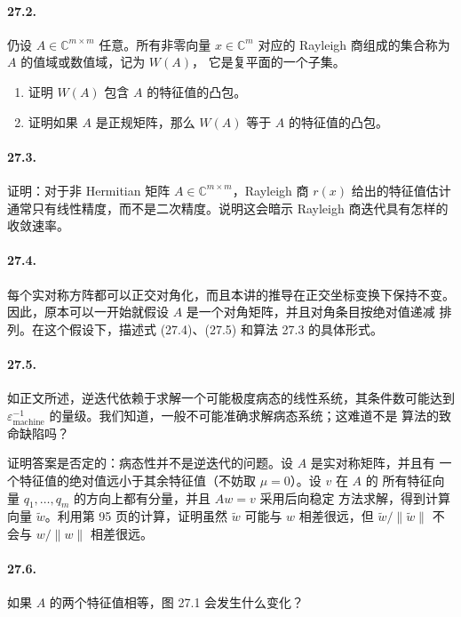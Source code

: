 \documentclass[UTF8,fontset=none,12pt]{ctexart}
\newcommand{\epsmach}{\varepsilon_{\mathrm{machine}}}
\begin{document}
\paragraph{27.2.}
仍设 $A\in\mathbb{C}^{m\times m}$ 任意。所有非零向量 $x\in\mathbb{C}^m$
对应的 Rayleigh 商组成的集合称为 $A$ 的值域或数值域，记为 $W(A)$，
它是复平面的一个子集。

\begin{enumerate}[label=(\alph*)]
  \item 证明 $W(A)$ 包含 $A$ 的特征值的凸包。
  \item 证明如果 $A$ 是正规矩阵，那么 $W(A)$ 等于 $A$ 的特征值的凸包。
\end{enumerate}

\paragraph{27.3.}
证明：对于非 Hermitian 矩阵 $A\in\mathbb{C}^{m\times m}$，Rayleigh 商
$r(x)$ 给出的特征值估计通常只有线性精度，而不是二次精度。说明这会暗示
Rayleigh 商迭代具有怎样的收敛速率。

\paragraph{27.4.}
每个实对称方阵都可以正交对角化，而且本讲的推导在正交坐标变换下保持不变。
因此，原本可以一开始就假设 $A$ 是一个对角矩阵，并且对角条目按绝对值递减
排列。在这个假设下，描述式 (27.4)、(27.5) 和算法 27.3 的具体形式。

\paragraph{27.5.}
如正文所述，逆迭代依赖于求解一个可能极度病态的线性系统，其条件数可能达到
$\epsmach^{-1}$ 的量级。我们知道，一般不可能准确求解病态系统；这难道不是
算法的致命缺陷吗？

证明答案是否定的：病态性并不是逆迭代的问题。设 $A$ 是实对称矩阵，并且有
一个特征值的绝对值远小于其余特征值（不妨取 $\mu=0$）。设 $v$ 在 $A$ 的
所有特征向量 $q_1,\ldots,q_m$ 的方向上都有分量，并且 $Aw=v$ 采用后向稳定
方法求解，得到计算向量 $\widetilde w$。利用第 95 页的计算，证明虽然
$\widetilde w$ 可能与 $w$ 相差很远，但
$\widetilde w/\|\widetilde w\|$ 不会与 $w/\|w\|$ 相差很远。

\paragraph{27.6.}
如果 $A$ 的两个特征值相等，图 27.1 会发生什么变化？
\end{document}
